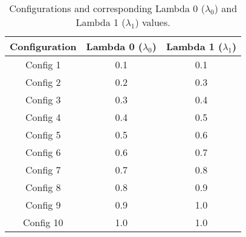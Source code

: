 \begin{table}[ht]
    \centering
    \begin{tabular}{|c|c|c|}
        \hline
        \textbf{Configuration} & \textbf{Lambda 0 ($\lambda_0$)} & \textbf{Lambda 1 ($\lambda_1$)} \\ 
        \hline
        Config 1 & 0.1 & 0.1 \\ 
        \hline
        Config 2 & 0.2 & 0.3 \\ 
        \hline
        Config 3 & 0.3 & 0.4 \\ 
        \hline
        Config 4 & 0.4 & 0.5 \\ 
        \hline
        Config 5 & 0.5 & 0.6 \\ 
        \hline
        Config 6 & 0.6 & 0.7 \\ 
        \hline
        Config 7 & 0.7 & 0.8 \\ 
        \hline
        Config 8 & 0.8 & 0.9 \\ 
        \hline
        Config 9 & 0.9 & 1.0 \\
        \hline
        Config 10 & 1.0 & 1.0 \\
        \hline
    \end{tabular}
    \caption{Configurations and corresponding Lambda 0 ($\lambda_0$) and Lambda 1 ($\lambda_1$) values.}
    \label{tab:lambda_configurations}
\end{table}



